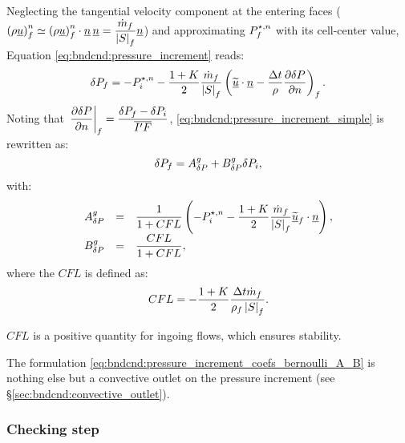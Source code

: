 Neglecting the tangential velocity component at the entering faces ($\left(\rho \underline{u} \right)^n_{f} \simeq \left(\rho \underline{u} \right)^n_{f} \cdot \underline{n} \, \underline{n} = \dfrac{ \dot{m}_{f} }{\left| S \right|_{f}} \underline{n} $) and approximating $P^{\star, n}_{f}$ with its cell-center value, Equation \ref{eq:bndcnd:pressure_increment} reads:
%
 \begin{equation}\label{eq:bndcnd:pressure_increment_simple}
\delta P_{f} = -P^{\star, n}_i - \dfrac{1+K}{2} \dfrac{ \dot{m}_{f} }{\left| S \right|_{f}}
\left( \widetilde{\underline{u}} \cdot \underline{n}
- \dfrac{\Delta t}{\rho} \dfrac{\partial \delta P }{\partial n} \right)_{f}.
\end{equation}
Noting that $  \left. \dfrac{\partial \delta P }{\partial n} \right|_{{f}} = \dfrac{\delta P_{f} -  \delta P_i }{\overline{{I^\prime} F}}$,  \eqref{eq:bndcnd:pressure_increment_simple} is rewritten as:
\begin{equation}\label{eq:bndcnd:pressure_increment_coefs_bernoulli}
\delta P_{f} = A^g_{\delta P} + B^g_{\delta P} \delta P_i,
\end{equation}
with:
\begin{equation}\label{eq:bndcnd:pressure_increment_coefs_bernoulli_A_B}
\begin{array}{r c l}
 A^g_{\delta P}  & = & \dfrac{1}{1 + CFL} \left( - P^{\star, n}_i - \dfrac{1+K}{2} \dfrac{ \dot{m}_{f} }{\left| S \right|_{f}}
\widetilde{\underline{u}}_{f} \cdot \underline{n}
  \right), \\
 B^g_{\delta P} & = & \dfrac{CFL}{1 + CFL} ,
\end{array}
\end{equation}
where the $CFL$ is defined as:
\begin{equation}\label{eq:bndcnd:pressure_increment_coefs_bernoulli_A_B}
CFL = - \dfrac{1+K}{2} \dfrac{\Delta t \dot{m}_{f} }{ \rho_{f} \left| S \right|_{f}}.
\end{equation}
%
\begin{remark}
$CFL$ is a positive quantity for ingoing flows, which ensures stability.
\end{remark}
\begin{remark}
The formulation \eqref{eq:bndcnd:pressure_increment_coefs_bernoulli_A_B} is nothing else but
a convective outlet on the pressure increment (see \S \ref{sec:bndcnd:convective_outlet}).
\end{remark}

\subsubsection{Checking step}

